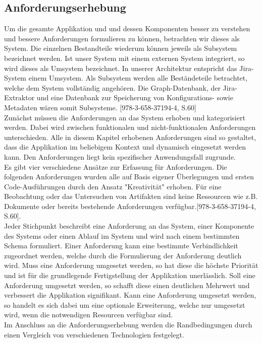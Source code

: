 \subsection{Anforderungserhebung}
Um die gesamte Applikation und und dessen Komponenten besser zu verstehen und bessere Anforderungen formulieren zu können, betrachten wir dieses als System. Die einzelnen Bestandteile wiederum können jeweils als Subsystem bezeichnet werden. Ist unser System mit einem externen System integriert, so wird dieses als Umsystem bezeichnet. In unserer Architektur entspricht das Jira-System einem Umsystem. Als Subsystem werden alle Beständeteile betrachtet, welche dem System vollständig angehören. Die Graph-Datenbank, der Jira-Extraktor und eine Datenbank zur Speicherung von Konfigurations- sowie Metadaten wären somit Subsysteme. [978-3-658-37194-4, S.60] \\
Zunächst müssen die Anforderungen an das System erhoben und kategorisiert werden. Dabei wird zwischen funktionalen und nicht-funktionalen Anforderungen unterschieden. Alle in diesem Kapitel erhobenen Anforderungen sind so gestaltet, dass die Applikation im beliebigem Kontext  und dynamisch eingesetzt werden kann. Den Anforderungen liegt kein spezifischer Anwendungsfall zugrunde.\\
Es gibt vier verschiedene Ansätze zur Erfassung für Anforderungen. Die folgenden Anforderungen wurden alle auf Basis eigener Überlegungen und ersten Code-Ausführungen durch den Ansatz "Kreativität" erhoben. Für eine Beobachtung oder das Untersuchen von Artifakten sind keine Ressourcen wie z.B. Dokumente oder bereits bestehende Anforderungen verfügbar.[978-3-658-37194-4, S.60]. \\
Jeder Stichpunkt beschreibt eine Anforderung an das System, einer Komponente des Systems oder einen Ablauf im System und wird nach einem bestimmten Schema formuliert. Einer Anforderung kann eine bestimmte Verbindlichkeit zugeordnet werden, welche durch die Formulierung der Anforderung deutlich wird. Muss eine Anforderung umgesetzt werden, so hat diese die höchste Priorität und ist für die grundlegende Fertigstellung der Applikation unerlässlich. Soll eine Anforderung umgesetzt werden, so schafft diese einen deutlichen Mehrwert und verbessert die Applikation signifikant. Kann eine Anforderung umgesetzt werden, so handelt es sich dabei um eine optionale Erweiterung, welche nur umgesetzt wird, wenn die notwendigen Resourcen verfügbar sind.\\
Im Anschluss an die Anforderungserhebung werden die Randbedingungen durch einen Vergleich von verschiedenen Technologien festgelegt.
